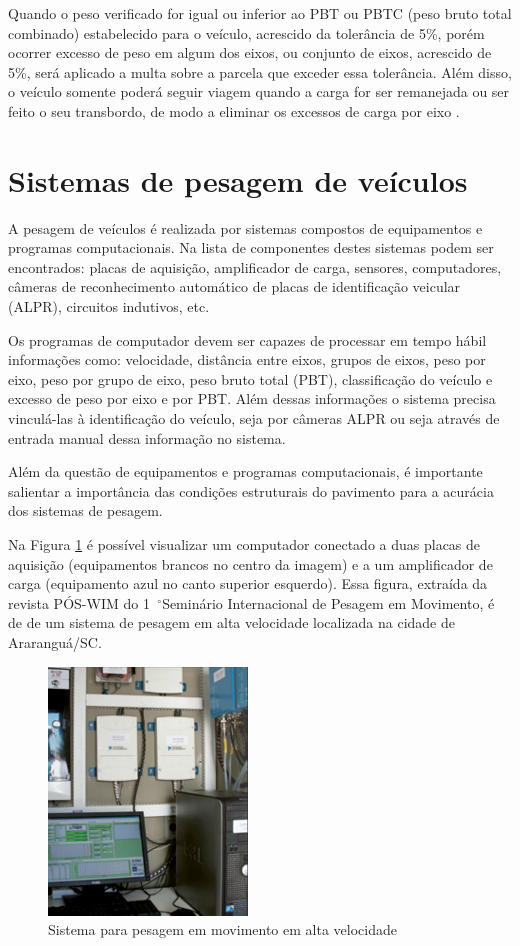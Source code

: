 \documentclass{ufscThesis}
\newcommand{\grad}{\hspace{-2mm}$\phantom{a}^{\circ}$}
\begin{document}
Quando o peso verificado for igual ou inferior ao PBT ou PBTC (peso bruto total combinado) estabelecido para o veículo, acrescido da tolerância de 5\%, porém ocorrer excesso de peso em algum dos eixos, ou conjunto de eixos, acrescido de 5\%, será aplicado a multa sobre a parcela que exceder essa tolerância. Além disso, o veículo somente poderá seguir viagem quando a carga for ser remanejada ou ser feito o seu transbordo, de modo a eliminar os excessos de carga por eixo \cite{tech:dnit-ppv-guia-pratico-operacao}.

\section{Sistemas de pesagem de veículos}\label{sec:ppv-sistemas}
A pesagem de veículos é realizada por sistemas compostos de equipamentos e programas computacionais. Na lista de componentes destes sistemas podem ser encontrados: placas de aquisição, amplificador de carga, sensores, computadores, câmeras de reconhecimento automático de placas de identificação veicular (ALPR), circuitos indutivos, etc. 

Os programas de computador devem ser capazes de processar em tempo hábil informações como: velocidade, distância entre eixos, grupos de eixos, peso por eixo, peso por grupo de eixo, peso bruto total (PBT), classificação do veículo e excesso de peso por eixo e por PBT. Além dessas informações o sistema precisa vinculá-las à identificação do veículo, seja por câmeras ALPR ou seja através de entrada manual dessa informação no sistema.

Além da questão de equipamentos e programas computacionais, é importante salientar a importância das condições estruturais do pavimento para a acurácia dos sistemas de pesagem.

Na Figura \ref{fig:sistema-hswim} é possível visualizar um computador conectado a duas placas de aquisição (equipamentos brancos no centro da imagem) e a um amplificador de carga (equipamento azul no canto superior esquerdo). Essa figura, extraída da revista PÓS-WIM do 1\grad Seminário Internacional de Pesagem em Movimento, é de de um sistema de pesagem em alta velocidade localizada na cidade de Araranguá/SC.

\begin{figure}[h!]
  \caption{Sistema para pesagem em movimento em alta velocidade \cite{magazine:pos-wim-1}}
  \label{fig:sistema-hswim}
  \centering
    \includegraphics[scale=1]{./figuras/abrigo-pista-experimental.png}
\end{figure}
\end{document}
